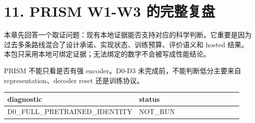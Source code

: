 \section{11. PRISM W1-W3 的完整复盘}

本章先回答一个取证问题：现有本地证据能否支持对应的科学判断。它重要是因为过去多条路线混合了设计承诺、实现状态、训练预算、评价语义和 hosted 结果。本包只采用本地可绑定证据；无法绑定的数字不会被写成性能结论。



PRISM 不能只看是否有强 encoder。D0-D3 未完成前，不能判断低分主要来自 representation、decoder reset 还是训练协议。

\begin{longtable}{p{0.19\linewidth}p{0.19\linewidth}p{0.19\linewidth}p{0.19\linewidth}p{0.19\linewidth}}
\toprule
diagnostic & status\\
\midrule
D0\_FULL\_PRETRAINED\_IDENTITY & NOT\_RUN\\
\bottomrule
\end{longtable}



\clearpage